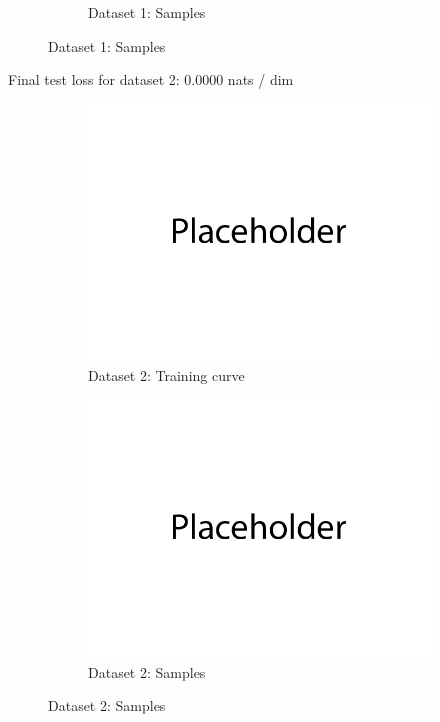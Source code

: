 \documentclass{article}
\begin{document}
\begin{enumerate}[(a)]
\begin{figure}[H]
\begin{subfigure}{0.45\textwidth}
        \caption{Dataset 1: Samples}
    \end{subfigure}
\end{figure}
Final test loss for dataset 2: 0.0000  nats / dim
\begin{figure}[H]
    \centering
    \begin{subfigure}{0.45\textwidth}
        \centering
        \includegraphics[width=\textwidth]{figures/q3_a_dset2_train_plot.png}
        \caption{Dataset 2: Training curve}
    \end{subfigure}
    \hspace{0.2in}
    \begin{subfigure}{0.45\textwidth}
        \centering
        \includegraphics[width=\textwidth]{figures/q3_a_dset2_samples.png}
        \caption{Dataset 2: Samples}
    \end{subfigure}
\end{figure}


\end{enumerate}
\end{document}
